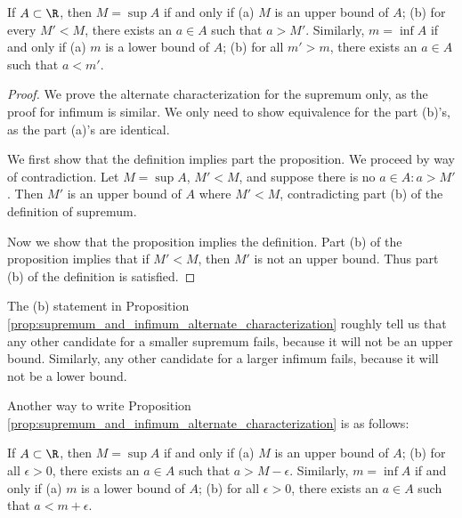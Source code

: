 \documentclass{article} %
\begin{document}
\begin{proposition}

If $A \subset \R$, then $M = \sup A$ if and only if (a) $M$ is an upper bound of $A$; (b) for every $M' < M$, there exists an $a \in A$ such that $a>M'$.  Similarly, $m = \inf A$ if and only if (a) $m$ is a lower bound of $A$; (b) for all $m'>m$, there exists an $a \in A$ such that $a<m'$.

\begin{proof}
We prove the alternate characterization for the supremum only, as the proof for infimum is similar.    We only need to show equivalence for the part (b)'s, as the part (a)'s are identical. 

We first show that the definition implies part the proposition.  We proceed by way of contradiction.  Let $M = \sup A$, $M' <M$, and suppose there is no $a \in A : a > M'$. Then $M'$ is an upper bound of $A$ where $M' <M$, contradicting part (b) of the definition of supremum.   

Now we show that the proposition implies the definition. Part (b) of the proposition implies that if $M' < M$, then $M'$ is not an upper bound. Thus part (b) of the definition is satisfied.
\end{proof}
\label{prop:supremum_and_infimum_alternate_characterization}
\end{proposition}



\begin{remark}
The (b) statement in Proposition \ref{prop:supremum_and_infimum_alternate_characterization} roughly tell us that any other candidate for a smaller supremum fails, because it will not be an upper bound.  Similarly, any other candidate for a larger infimum fails, because it will not be a lower bound. 	
\end{remark}

\begin{remark}
Another way to write Proposition \ref{prop:supremum_and_infimum_alternate_characterization} is as follows:	

If $A \subset \R$, then $M = \sup A$ if and only if (a) $M$ is an upper bound of $A$; (b) for all $\epsilon >0$, there exists an $a \in A$ such that $a>M-\epsilon$.  Similarly, $m = \inf A$ if and only if (a) $m$ is a lower bound of $A$; (b) for all $\epsilon >0$, there exists an $a \in A$ such that $a<m+\epsilon$.
\label{rk:usage_of_alternate_characterization_of_inf_and_sup}
\end{remark}
\end{document}
